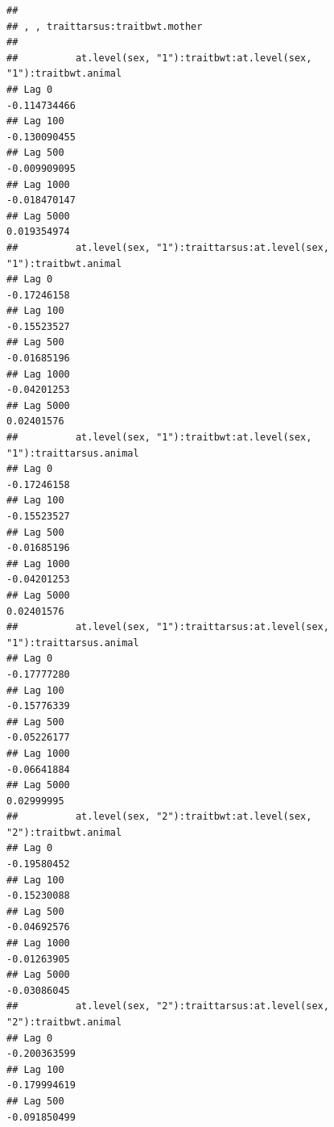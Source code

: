 \documentclass[
  12pt,
]{book}
\begin{document}
\begin{verbatim}
## 
## , , traittarsus:traitbwt.mother
## 
##          at.level(sex, "1"):traitbwt:at.level(sex, "1"):traitbwt.animal
## Lag 0                                                      -0.114734466
## Lag 100                                                    -0.130090455
## Lag 500                                                    -0.009909095
## Lag 1000                                                   -0.018470147
## Lag 5000                                                    0.019354974
##          at.level(sex, "1"):traittarsus:at.level(sex, "1"):traitbwt.animal
## Lag 0                                                          -0.17246158
## Lag 100                                                        -0.15523527
## Lag 500                                                        -0.01685196
## Lag 1000                                                       -0.04201253
## Lag 5000                                                        0.02401576
##          at.level(sex, "1"):traitbwt:at.level(sex, "1"):traittarsus.animal
## Lag 0                                                          -0.17246158
## Lag 100                                                        -0.15523527
## Lag 500                                                        -0.01685196
## Lag 1000                                                       -0.04201253
## Lag 5000                                                        0.02401576
##          at.level(sex, "1"):traittarsus:at.level(sex, "1"):traittarsus.animal
## Lag 0                                                             -0.17777280
## Lag 100                                                           -0.15776339
## Lag 500                                                           -0.05226177
## Lag 1000                                                          -0.06641884
## Lag 5000                                                           0.02999995
##          at.level(sex, "2"):traitbwt:at.level(sex, "2"):traitbwt.animal
## Lag 0                                                       -0.19580452
## Lag 100                                                     -0.15230088
## Lag 500                                                     -0.04692576
## Lag 1000                                                    -0.01263905
## Lag 5000                                                    -0.03086045
##          at.level(sex, "2"):traittarsus:at.level(sex, "2"):traitbwt.animal
## Lag 0                                                         -0.200363599
## Lag 100                                                       -0.179994619
## Lag 500                                                       -0.091850499

\end{verbatim}
\end{document}
